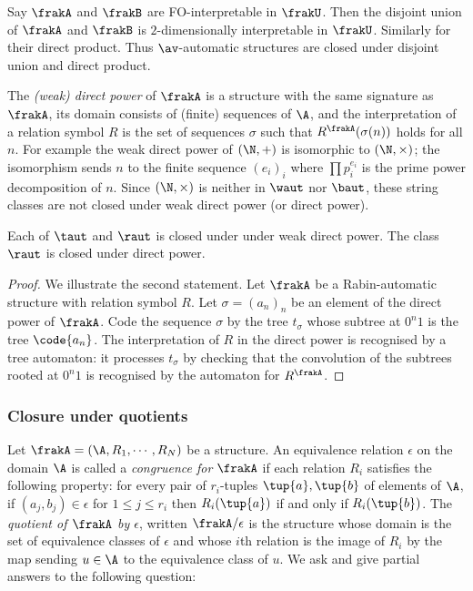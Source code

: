 Say $\frakA$ and $\frakB$ are FO-interpretable in $\frakU$. Then the disjoint union of $\frakA$ and $\frakB$ is $2$-dimensionally interpretable in $\frakU$. Similarly for their direct product.
Thus $\av$-automatic structures are closed under disjoint union and direct product.

The {\em (weak) direct power} of $\frakA$ is a structure with the same signature as $\frakA$, its domain consists 
of (finite) sequences of $\A$, and the 
interpretation of a relation symbol $R$ is the set of sequences $\sigma$ such that $R^\frakA(\sigma(n))$ holds for all $n$.
For example the weak direct power of $(\N,+)$ is isomorphic to $(\N,\times)$; the isomorphism sends $n$ to  the finite sequence $(e_i)_i$ where
$ \prod p_i^{e_i}$ is the prime power decomposition of $n$. Since $(\N,\times)$ is neither in $\waut$ nor $\baut$, these string classes are not closed under weak direct power (or direct power).
 
\begin{proposition} \label{AS:prop:powerclosure} \cite{Blum99}
Each of  $\taut$ and $\raut$ is closed under under weak direct power. The class $\raut$ is closed under direct power.
\end{proposition}

\begin{proof}
We illustrate the second statement.
Let $\frakA$ be a Rabin-automatic structure with relation symbol $R$.
Let $\sigma = (a_n)_n$ be an element of the direct power of $\frakA$.
Code the sequence $\sigma$ by the tree $t_\sigma$ whose subtree at $0^n1$ is the tree $\code{a_n}$.
The interpretation of $R$ in the direct power is recognised by a tree automaton: it  processes $t_\sigma$ by checking
that the convolution of the subtrees rooted at $0^n1$ is recognised by the automaton for $R^\frakA$.
\end{proof}

\subsubsection*{Closure under quotients} \label{AS:subsub:quotient}
Let $\frakA = ({\A},R_1,\cdots,R_N)$ be a structure.
An equivalence relation $\epsilon$ on the domain ${\A}$ is called a {\em congruence for $\frakA$} if each relation $R_i$ satisfies the following property:
for every pair of $r_i$-tuples $\tup{a},\tup{b}$ of elements of ${\A}$, if $(a_j,b_j) \in  \epsilon$ for $1 \leq j \leq r_i$ then $R_i(\tup{a})$ if and only if $R_i(\tup{b})$.
The {\em quotient of $\frakA$ by $\epsilon$}, written $\frakA/\epsilon$ is the structure whose domain is the set of equivalence classes of $\epsilon$ and whose $i$th relation
is the image of $R_i$ by the map sending $u \in {\A}$ to the equivalence class of $u$. We ask and give partial answers to the following question:

